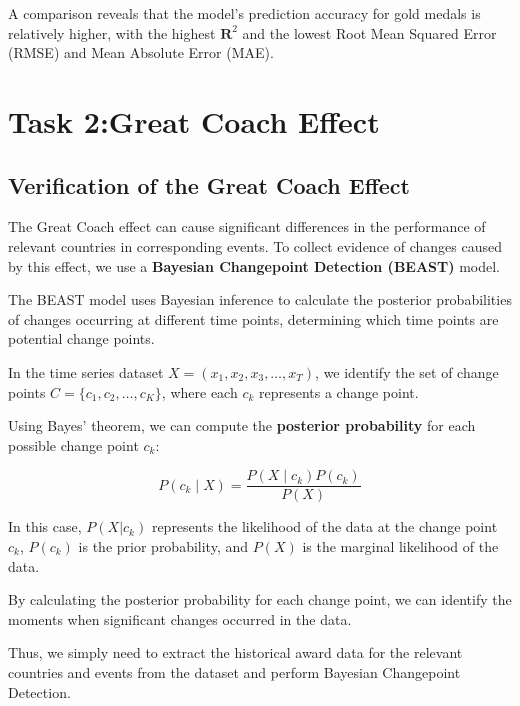 \documentclass[12pt]{article}  %
\begin{document}
A comparison reveals that the model's prediction accuracy for gold medals is relatively higher, with the highest \(\mathbf{R}^2\) and the lowest Root Mean Squared Error (RMSE) and Mean Absolute Error (MAE).








\section{Task 2:Great Coach Effect}
\subsection{Verification of the Great Coach Effect}
The Great Coach effect can cause significant differences in the performance of relevant countries in corresponding events. To collect evidence of changes caused by this effect, we use a \textbf{Bayesian Changepoint Detection (BEAST)} model.

The BEAST model uses Bayesian inference to calculate the posterior probabilities of changes occurring at different time points, determining which time points are potential change points.

In the time series dataset \(X = (x_1, x_2, x_3, \ldots, x_T)\), we identify the set of change points \(C = \{c_1, c_2, \ldots, c_K\}\), where each \(c_k\) represents a change point.

Using Bayes' theorem\cite{1}, we can compute the \textbf{posterior probability} for each possible change point $c_k$:

\begin{equation}
	P(c_k \mid X) = \frac{P(X \mid c_k) P(c_k)}{P(X)}
\end{equation}

In this case, \( P(X|c_k) \) represents the likelihood of the data at the change point \( c_k \), \( P(c_k) \) is the prior probability, and \( P(X) \) is the marginal likelihood of the data.

By calculating the posterior probability for each change point, we can identify the moments when significant changes occurred in the data.

Thus, we simply need to extract the historical award data for the relevant countries and events from the dataset and perform Bayesian Changepoint Detection.
\end{document}
